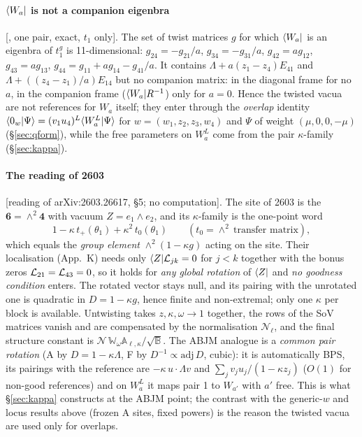 \paragraph{$\langle W_a|$ is not a companion eigenbra} [, one pair, exact, $t_1$ only]. The set of twist matrices $g$ for which $\langle W_a|$ is an eigenbra of $t_1^g$
is 11-dimensional: $g_{24}=-g_{21}/a$, $g_{34}=-g_{31}/a$, $g_{42}=ag_{12}$, $g_{43}=ag_{13}$, $g_{44}=g_{11}+ag_{14}-g_{41}/a$. It contains $\Lambda+a(z_1-z_4)E_{41}$ and $\Lambda+((z_4-z_1)/a)E_{14}$ but
no companion matrix: in the diagonal frame for no $a$, in the companion frame ($\langle W_a|R^{-1}$) only for $a=0$. Hence the twisted vacua are not references for $W_a$ itself; they enter through the \emph{overlap}
identity $\langle0_w|\Psi\rangle=(v_1u_4)^L\langle W_a^L|\Psi\rangle$ for $w=(w_1,z_2,z_3,w_4)$ and $\Psi$ of weight $(\mu,0,0,-\mu)$ (\S\ref{sec:qform}), while the free parameters on $W_a^L$ come from the pair $\kappa$-family
(\S\ref{sec:kappa}).

\paragraph{The reading of 2603} [reading of arXiv:2603.26617,  \S5; no computation]. The site of 2603 is the $\mathbf6=\wedge^2\mathbf4$ with vacuum $Z=e_1\wedge e_2$, and its $\kappa$-family is the one-point word
\begin{equation}
 1-\kappa\,t_+(\theta_1)+\kappa^2\,t_0(\theta_1)\qquad(t_0=\wedge^2\ \text{transfer matrix}),
\end{equation}
which equals the \emph{group element} $\wedge^2(1-\kappa g)$ acting on the site. Their localisation (App.~K) needs only $\langle Z|\mathcal L_{jk}=0$ for $j<k$ together with the bonus zeros $\mathcal L_{21}=\mathcal L_{43}=0$, so it holds for
\emph{any global rotation} of $\langle Z|$ and \emph{no goodness condition} enters. The rotated vector stays null, and its pairing with the unrotated one is quadratic in $D=1-\kappa g$, hence finite and non-extremal; only one $\kappa$ per block is available. Untwisting takes
$z,\kappa,\omega\to1$ together, the rows of the SoV matrices vanish and are compensated by the normalisation $\mathcal N_\ell$, and the final structure constant is $\mathcal N\,\mathbb W_\omega\mathbb A_{\ell,\kappa}/\sqrt{\mathbb B}$.
The ABJM analogue is a \emph{common pair rotation} (A by $D=1-\kappa\Lambda$, F by $D^{-1}\propto\mathrm{adj}\,D$, cubic): it is automatically BPS, its pairings with the reference are $-\kappa\,u\cdot\Lambda v$ and $\sum_jv_ju_j/(1-\kappa z_j)$
($O(1)$ for non-good references) and on $W_a^L$ it maps pair 1 to $W_{a'}$ with $a'$ free. This is what \S\ref{sec:kappa} constructs at the ABJM point; the contrast with the generic-$w$ and locus results above (frozen A sites, fixed powers) is the reason the twisted vacua are
used only for overlaps.
